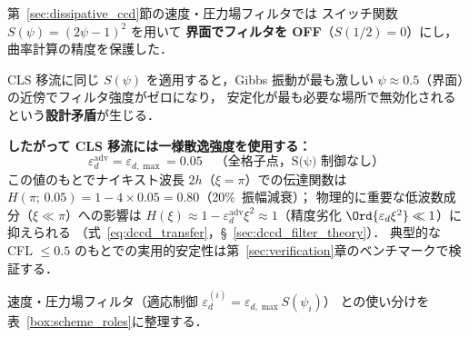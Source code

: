 \begin{tcolorbox}[warnbox, title={移流フィルタの散逸強度：S(ψ) 制御を使わない理由}]
\label{warn:adv_filter_uniform}

第~\ref{sec:dissipative_ccd}節の速度・圧力場フィルタでは
スイッチ関数 $S(\psi) = (2\psi-1)^2$ を用いて
\textbf{界面でフィルタを OFF}（$S(1/2) = 0$）にし，曲率計算の精度を保護した．

CLS 移流に同じ $S(\psi)$ を適用すると，Gibbs 振動が最も激しい
$\psi \approx 0.5$（界面）の近傍でフィルタ強度がゼロになり，
安定化が最も必要な場所で無効化されるという\textbf{設計矛盾}が生じる．

\textbf{したがって CLS 移流には一様散逸強度を使用する：}
\begin{equation}
  \varepsilon_d^{\mathrm{adv}} = \varepsilon_{d,\max} = 0.05 \quad\text{（全格子点，S(ψ) 制御なし）}
  \label{eq:eps_adv}
\end{equation}
この値のもとでナイキスト波長 $2h$（$\xi=\pi$）での伝達関数は
$H(\pi;\,0.05) = 1 - 4\times 0.05 = 0.80$（20\%\ 振幅減衰）；
物理的に重要な低波数成分（$\xi \ll \pi$）への影響は
$H(\xi) \approx 1 - \varepsilon_d^{\mathrm{adv}}\xi^2 \approx 1$（精度劣化 $\Ord{\varepsilon_d\xi^2} \ll 1$）に抑えられる
（式~\eqref{eq:dccd_transfer}，§~\ref{sec:dccd_filter_theory}）．
典型的な CFL $\leq 0.5$ のもとでの実用的安定性は第~\ref{sec:verification}章のベンチマークで検証する．

速度・圧力場フィルタ（適応制御 $\varepsilon_d^{(i)} = \varepsilon_{d,\max}S(\psi_i)$）
との使い分けを表~\ref{box:scheme_roles}に整理する．
\end{tcolorbox}

